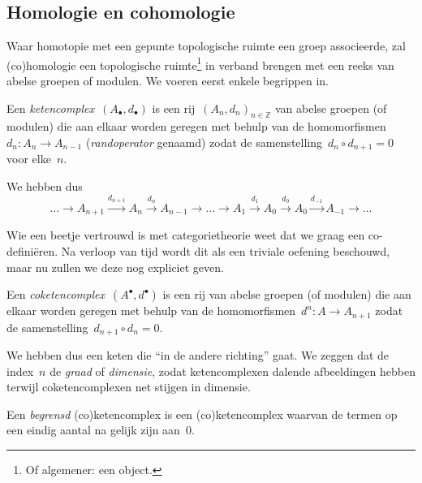 \documentclass[a4paper,11pt,openany,oneside,article]{memoir}
\begin{document}
\subsection{Homologie en cohomologie}\label{subsection:homology-and-cohomology}
Waar homotopie met een gepunte topologische ruimte een groep associeerde, zal (co)homologie een topologische ruimte\footnote{Of algemener: een object.} in verband brengen met een reeks van abelse groepen of modulen. We voeren eerst enkele begrippen in.

\begin{definition}
  Een \emph{ketencomplex}~$(A_\bullet,d_\bullet)$ is een rij~$(A_n,d_n)_{n\in\mathbb{Z}}$ van abelse groepen (of modulen) die aan elkaar worden geregen met behulp van de homomorfismen~$d_n\colon A_n\to A_{n-1}$ (\emph{randoperator} genaamd) zodat de samenstelling~$d_n\circ d_{n+1}=0$ voor elke~$n$.

  We hebben dus
  \begin{equation}
    \ldots\longrightarrow A_{n+1}\overset{d_{n+1}}{\longrightarrow}A_n\overset{d_n}{\longrightarrow}A_{n-1}\longrightarrow\ldots\longrightarrow A_1\overset{d_1}{\longrightarrow}A_0\overset{d_0}{\longrightarrow}A_0\overset{d_{-1}}\longrightarrow A_{-1}\longrightarrow\ldots
  \end{equation}
\end{definition}

Wie een beetje vertrouwd is met categorietheorie weet dat we graag een co- defini\"eren. Na verloop van tijd wordt dit als een triviale oefening beschouwd, maar nu zullen we deze nog expliciet geven.

\begin{definition}
  Een \emph{coketencomplex}~$(A^\bullet,d^\bullet)$ is een rij van abelse groepen (of modulen) die aan elkaar worden geregen met behulp van de homomorfismen~$d^n\colon A\to A_{n+1}$ zodat de samenstelling~$d_{n+1}\circ d_n=0$.
\end{definition}

We hebben dus een keten die ``in de andere richting'' gaat. We zeggen dat de index~$n$ de \emph{graad} of \emph{dimensie}, zodat ketencomplexen dalende afbeeldingen hebben terwijl coketencomplexen net stijgen in dimensie.

\begin{definition}
  Een \emph{begrensd} (co)ketencomplex is een (co)ketencomplex waarvan de termen op een eindig aantal na gelijk zijn aan~$0$.
\end{definition}
\end{document}

